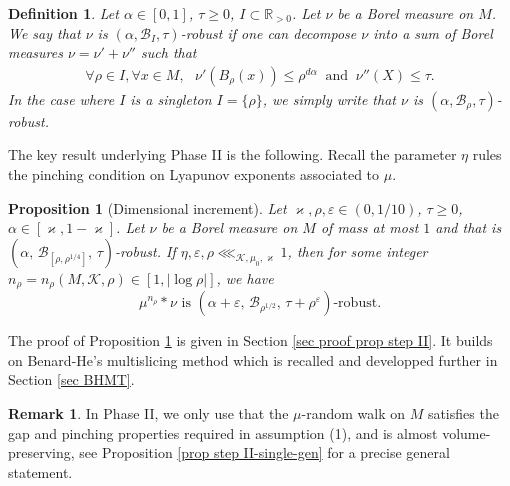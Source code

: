 \documentclass[11pt, leqno, fleqn]{amsart}
\def\eps{\varepsilon}
\newcommand{\margem}[1]{\marginpar{{\scriptsize {#1}}}}
\def\cB{          \mathcal B}
\def\clo{   \color{orange}}
\def \R{{\mathbb R}}
\newcommand{\cK}{{\mathcal K}}
\newcommand{\aryst}{\begin{eqnarray*}}
\newcommand{\earyst}{\end{eqnarray*}}
\newtheorem{prop}[thm]{\bf Proposition}
\newtheorem{defi}[thm]{\bf Definition}
\theoremstyle{definition}
\newtheorem{rema}[thm]{\bf Remark}
\theoremstyle{definition}
\begin{document}
  \begin{defi} 
  	Let $\alpha \in [0, 1]$, $\tau \geq 0$,  $I \subset \R_{ > 0}$. Let $\nu$ be a Borel measure on $M$. 
  	We say that $\nu$ is { \em $(\alpha, \cB_{I}, \tau)$-robust} if one can decompose $\nu$ into a sum of Borel measures $\nu = \nu' + \nu''$ such that 
		\aryst
  \forall \rho\in I,	\forall x \in M,\,\, 	\,\,\nu'( B_{\rho}(x) ) \leq \rho^{d\alpha} \ \mbox{ and } \  \nu''(X) \leq \tau.
  	\earyst
In the case where $I$ is a singleton $I=\{\rho\}$, we simply write that $\nu$ is $(\alpha, \cB_{\rho}, \tau)$-robust. 
  \end{defi}


The key result underlying  Phase II is the following.  Recall the parameter $\eta$ rules the pinching condition on Lyapunov exponents associated to $\mu$. 

  	   \begin{prop}[Dimensional  increment] \label{prop step II-single} 
		 	Let $\varkappa,\rho,  \eps \in (0,1/10)$,   $\tau \geq 0$, $\alpha \in [\varkappa, 1 - \varkappa]$. Let $\nu$ be a Borel measure on $M$ of mass at most $1$ and that is $(\alpha, \, \cB_{[\rho, \rho^{1/4}]},\, \tau)$-robust.  If    $\eta, \eps, \rho\lll_{\cK,\mu_{0}, \varkappa}1$, then for some integer $n_{\rho} =n_{\rho}(M, \cK, \rho)\in [1, | \log \rho |]$, we have 
		$$\text{$\mu^{n_{\rho}} * \nu$ is $(\alpha + \eps,  \,\cB_{\rho^{1/2}},\, \tau + \rho^{\eps})$-robust.}$$
		 \end{prop}

		 
		 
		 
	The proof of  Proposition \ref{prop step II-single} is given in Section \ref{sec proof prop step II}. It builds on Benard-He's multislicing method \cite{BH1, BH2} which is recalled and developped further in Section \ref{sec BHMT}.
		 
	 \begin{rema}   
	 	In Phase II, we only use that the $\mu$-random walk on $M$ satisfies the gap and pinching properties required in assumption (1), and is almost volume-preserving, see  Proposition \ref{prop step II-single-gen} for a precise general statement. 
		 \end{rema}
		 
\end{document}
